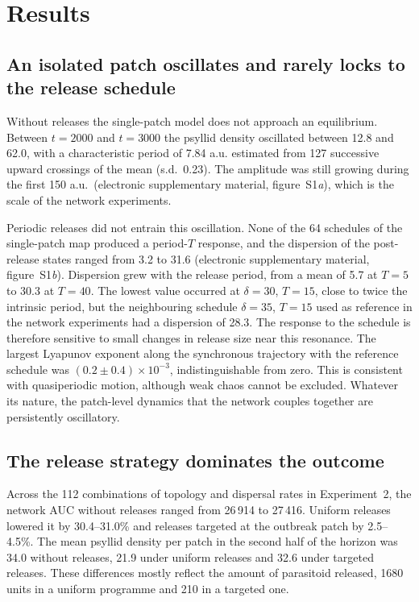 \section{Results}
\label{sec:results}

\subsection{An isolated patch oscillates and rarely locks to the release schedule}
\label{sec:res-intrinsic}

Without releases the single-patch model does not approach an equilibrium. Between $t = 2000$ and $t = 3000$ the psyllid density oscillated between 12.8 and 62.0, with a characteristic period of 7.84 a.u. estimated from 127 successive upward crossings of the mean (s.d.\ 0.23). The amplitude was still growing during the first 150 a.u.\ (electronic supplementary material, figure~S1\emph{a}), which is the scale of the network experiments.

Periodic releases did not entrain this oscillation. None of the 64 schedules of the single-patch map produced a period-$T$ response, and the dispersion of the post-release states ranged from 3.2 to 31.6 (electronic supplementary material, figure~S1\emph{b}). Dispersion grew with the release period, from a mean of 5.7 at $T = 5$ to 30.3 at $T = 40$. The lowest value occurred at $\delta = 30$, $T = 15$, close to twice the intrinsic period, but the neighbouring schedule $\delta = 35$, $T = 15$ used as reference in the network experiments had a dispersion of 28.3. The response to the schedule is therefore sensitive to small changes in release size near this resonance. The largest Lyapunov exponent along the synchronous trajectory with the reference schedule was $(0.2 \pm 0.4)\times10^{-3}$, indistinguishable from zero. This is consistent with quasiperiodic motion, although weak chaos cannot be excluded. Whatever its nature, the patch-level dynamics that the network couples together are persistently oscillatory.

\subsection{The release strategy dominates the outcome}
\label{sec:res-strategy}

Across the 112 combinations of topology and dispersal rates in Experiment~2, the network AUC without releases ranged from 26\,914 to 27\,416. Uniform releases lowered it by 30.4--31.0\% and releases targeted at the outbreak patch by 2.5--4.5\%. The mean psyllid density per patch in the second half of the horizon was 34.0 without releases, 21.9 under uniform releases and 32.6 under targeted releases. These differences mostly reflect the amount of parasitoid released, 1680 units in a uniform programme and 210 in a targeted one.

